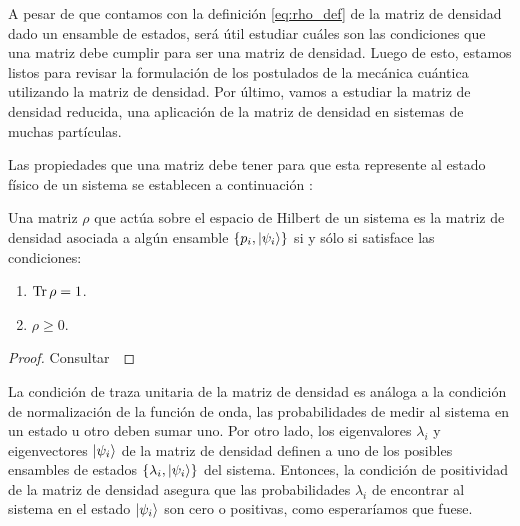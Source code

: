 
A pesar de que contamos con la definición \eqref{eq:rho_def} de 
la matriz de densidad dado un ensamble de estados, será útil 
estudiar cuáles son las condiciones que una matriz debe cumplir 
para ser una matriz de densidad. Luego de esto, estamos listos 
para revisar la formulación de los postulados de la mecánica cuántica
utilizando la matriz de densidad. Por último, vamos a estudiar la
matriz de densidad reducida, una aplicación de la matriz de densidad 
en sistemas de muchas partículas.

Las propiedades que una matriz debe tener para que esta represente al 
estado físico de un sistema se establecen a continuación
\cite{nielsen_chuang_2011}:
\begin{thm}\label{teo:density-operator}
Una matriz $\rho$  que actúa sobre el espacio de Hilbert de un sistema 
es la matriz de densidad asociada a algún ensamble 
$\{p_i, \ket{\psi _i} \}$ si y sólo si satisface las condiciones:
\begin{enumerate}
\item $\Tr \rho = 1$.
\item $\rho \geq 0$.
\end{enumerate}	
\end{thm} 
\begin{proof} Consultar~\cite[p.~101]{nielsen_chuang_2011} \end{proof}

La condición de traza unitaria de la matriz de densidad es análoga
a la condición de normalización de la función de onda, las probabilidades
de medir al sistema en un estado u otro deben sumar uno. 
Por otro lado, los eigenvalores $\lambda_i$ y eigenvectores $\ket{\psi_i}$ de la 
matriz de densidad definen a uno de los posibles ensambles de estados
$\{\lambda_i, \ket{\psi_i} \}$ del sistema. Entonces,
la condición de positividad de la matriz de densidad asegura que las
probabilidades $\lambda_i$ de encontrar al sistema en el estado $\ket{\psi_i}$
son cero o positivas, como esperaríamos que fuese.

